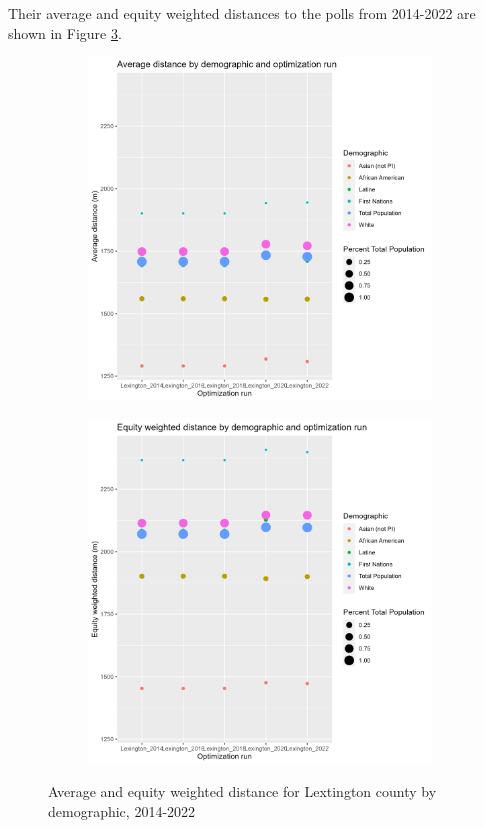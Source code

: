 \documentclass[11pt]{article}
\theoremstyle{remark}
\theoremstyle{definition}
\begin{document}
Their average and equity weighted distances to the polls from 2014-2022 are shown in Figure \ref{fig:Lexington distance graphs}.

\begin{figure}
	\begin{subfigure}{.8\textwidth}
		\centering
		\includegraphics[width=.8\linewidth]{result analysis/Lexington_SC_original_configs/orig_pop_scaled_avg}
		\label{sfig:Lexington avg dist}
	\end{subfigure} \newline
	\begin{subfigure}{.8\textwidth}
		\centering
		\includegraphics[width=.8\linewidth]{result analysis/Lexington_SC_original_configs/orig_pop_scaled_y_EDE}
		\label{sfig:Lexington equity dist}
	\end{subfigure}
	\caption{Average and equity weighted distance for Lextington county by demographic, 2014-2022}
	\label{fig:Lexington distance graphs}
\end{figure}
\end{document}
